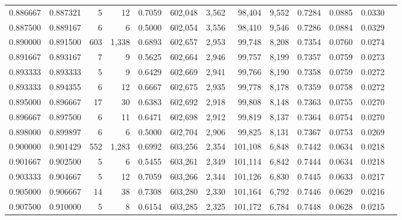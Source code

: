 \begin{tabular}{rrrrrrrrrrrrr}
0.886667 & 0.887321 &      5 &    12 &                                     0.7059 & 602,048 &   3,562 &  98,404 &   9,552 & 0.7284 & 0.0885 & 0.0330 \\
0.887500 & 0.889167 &      6 &     6 &                                     0.5000 & 602,054 &   3,556 &  98,410 &   9,546 & 0.7286 & 0.0884 & 0.0329 \\
0.890000 & 0.891500 &    603 & 1,338 &                                     0.6893 & 602,657 &   2,953 &  99,748 &   8,208 & 0.7354 & 0.0760 & 0.0274 \\
0.891667 & 0.893167 &      7 &     9 &                                     0.5625 & 602,664 &   2,946 &  99,757 &   8,199 & 0.7357 & 0.0759 & 0.0273 \\
0.893333 & 0.893333 &      5 &     9 &                                     0.6429 & 602,669 &   2,941 &  99,766 &   8,190 & 0.7358 & 0.0759 & 0.0272 \\
0.893333 & 0.894355 &      6 &    12 &                                     0.6667 & 602,675 &   2,935 &  99,778 &   8,178 & 0.7359 & 0.0758 & 0.0272 \\
0.895000 & 0.896667 &     17 &    30 &                                     0.6383 & 602,692 &   2,918 &  99,808 &   8,148 & 0.7363 & 0.0755 & 0.0270 \\
0.896667 & 0.897500 &      6 &    11 &                                     0.6471 & 602,698 &   2,912 &  99,819 &   8,137 & 0.7364 & 0.0754 & 0.0270 \\
0.898000 & 0.899897 &      6 &     6 &                                     0.5000 & 602,704 &   2,906 &  99,825 &   8,131 & 0.7367 & 0.0753 & 0.0269 \\
0.900000 & 0.901429 &    552 & 1,283 &                                     0.6992 & 603,256 &   2,354 & 101,108 &   6,848 & 0.7442 & 0.0634 & 0.0218 \\
0.901667 & 0.902500 &      5 &     6 &                                     0.5455 & 603,261 &   2,349 & 101,114 &   6,842 & 0.7444 & 0.0634 & 0.0218 \\
0.903333 & 0.904667 &      5 &    12 &                                     0.7059 & 603,266 &   2,344 & 101,126 &   6,830 & 0.7445 & 0.0633 & 0.0217 \\
0.905000 & 0.906667 &     14 &    38 &                                     0.7308 & 603,280 &   2,330 & 101,164 &   6,792 & 0.7446 & 0.0629 & 0.0216 \\
0.907500 & 0.910000 &      5 &     8 &                                     0.6154 & 603,285 &   2,325 & 101,172 &   6,784 & 0.7448 & 0.0628 & 0.0215 \\

\end{tabular}
